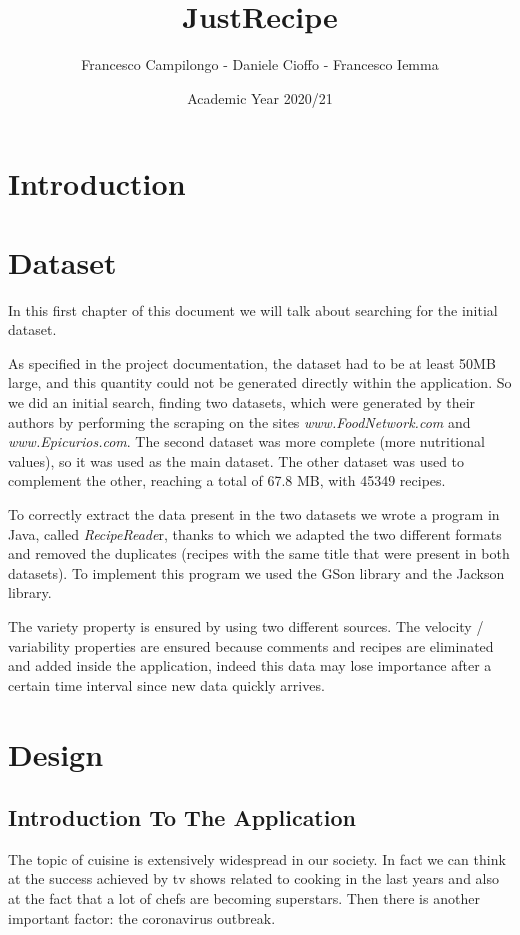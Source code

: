\documentclass[a4paper]{report}
\begin{document}
\title{\Huge{JustRecipe}}
\author{\Large{Francesco Campilongo - Daniele Cioffo - Francesco Iemma}}
\date{Academic Year 2020/21}
\maketitle
\tableofcontents

\chapter*{Introduction}

\chapter{Dataset}
In this first chapter of this document we will talk about searching for the initial dataset.

\noindent As specified in the project documentation, the dataset had to be at least 50MB large, and this quantity could not be generated directly within the application. So we did an initial search, finding two datasets, which were generated by their authors by performing the scraping on the sites \emph{www.FoodNetwork.com} and \emph{www.Epicurios.com}. The second dataset was more complete (more nutritional values), so it was used as the main dataset. The other dataset was used to complement the other, reaching a total of  67.8 MB, with 45349 recipes.

\noindent To correctly extract the data present in the two datasets we wrote a program in Java, called \emph{RecipeReade}r, thanks to which we adapted the two different formats and removed the duplicates (recipes with the same title that were present in both datasets).
To implement this program we used the GSon library and the Jackson library.

\noindent The variety property is ensured by using two different sources. The velocity / variability properties are ensured because comments and recipes are eliminated and added inside the application, indeed this data may lose importance after a certain time interval since new data quickly arrives.

\chapter{Design}
\section{Introduction To The Application}
The topic of cuisine is extensively widespread in our society. In fact we can think at the success achieved by tv shows related to cooking in the last years and also at the fact that a lot of chefs are becoming superstars.
Then there is another important factor: the coronavirus outbreak.
\end{document}
